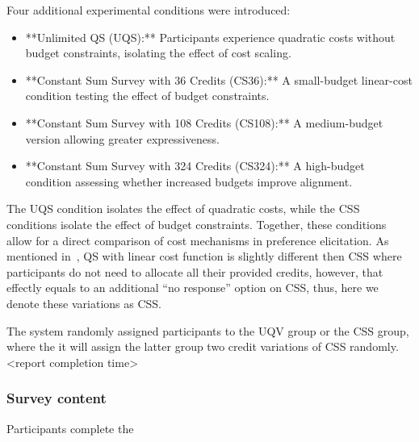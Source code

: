 Four additional experimental conditions were introduced:  
\begin{itemize}
    \item **Unlimited QS (UQS):** Participants experience quadratic costs without budget constraints, isolating the effect of cost scaling.
    \item **Constant Sum Survey with 36 Credits (CS36):** A small-budget linear-cost condition testing the effect of budget constraints.
    \item **Constant Sum Survey with 108 Credits (CS108):** A medium-budget version allowing greater expressiveness.
    \item **Constant Sum Survey with 324 Credits (CS324):** A high-budget condition assessing whether increased budgets improve alignment.
\end{itemize}

The UQS condition isolates the effect of quadratic costs, while the CSS conditions isolate the effect of budget constraints. Together, these conditions allow for a direct comparison of cost mechanisms in preference elicitation. As mentioned in~, QS with linear cost function is slightly different then CSS where participants do not need to allocate all their provided credits, however, that effectly equals to an additional ``no response'' option on CSS, thus, here we denote these variations as CSS.

The system randomly assigned participants to the UQV group or the CSS group, where the it will assign the latter group two credit variations of CSS randomly. <report completion time> 

\subsubsection{Survey content}
Participants complete the 



